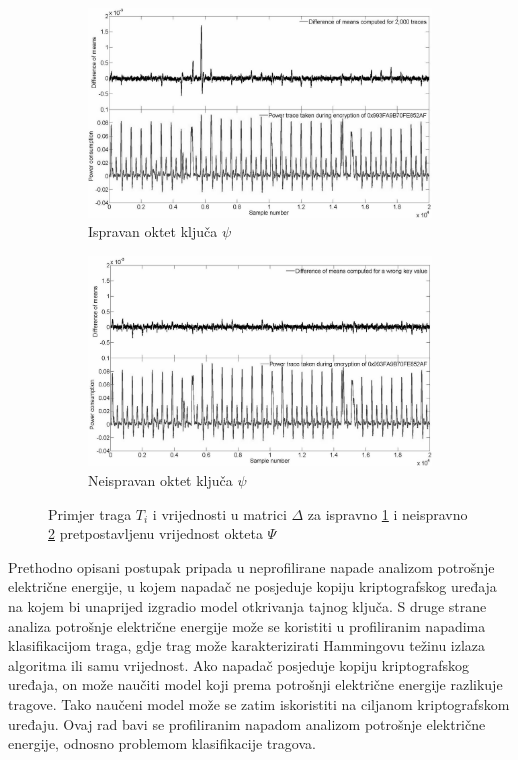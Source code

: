 \documentclass[times, utf8, numeric, diplomski]{fer}
\begin{document}
\begin{figure}[H]
\centering
\begin{subfigure}{.8\textwidth}
\includegraphics[width=\textwidth]{dpacorrect.jpg}
\centering
\caption{Ispravan oktet ključa $\psi$}
\label{fig:dpacorrect}
\end{subfigure}
\begin{subfigure}{.8\textwidth}
\includegraphics[width=\textwidth]{dpawrong.jpg}
\centering
\caption{Neispravan oktet ključa $\psi$}
\label{fig:dpawrong}
\end{subfigure}
\caption{Primjer traga $T_i$ i vrijednosti u matrici $\Delta$ za ispravno \ref{fig:dpacorrect} i neispravno \ref{fig:dpawrong} pretpostavljenu vrijednost okteta $\Psi$}
\label{fig:dpacompare}
\end{figure}

Prethodno opisani postupak pripada u neprofilirane napade analizom potrošnje električne energije, u kojem napadač ne posjeduje kopiju kriptografskog uređaja na kojem bi unaprijed izgradio model otkrivanja tajnog ključa. S druge strane analiza potrošnje električne energije može se koristiti u profiliranim napadima klasifikacijom traga, gdje trag može karakterizirati Hammingovu težinu izlaza algoritma ili samu vrijednost. Ako napadač posjeduje kopiju kriptografskog uređaja, on može naučiti model koji prema potrošnji električne energije razlikuje tragove. Tako naučeni model može se zatim iskoristiti na ciljanom kriptografskom uređaju. Ovaj rad bavi se profiliranim napadom analizom potrošnje električne energije, odnosno problemom klasifikacije tragova. 
\end{document}
